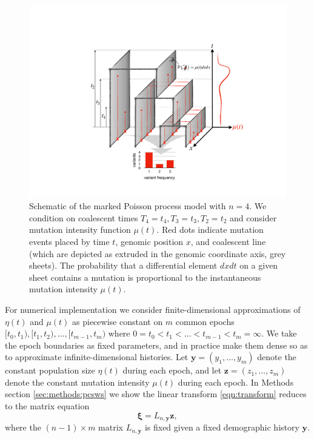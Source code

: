 \documentclass[11pt]{article}
\begin{document}
\begin{figure}
\centering
\includegraphics[width=\textwidth]{figures/model}
\caption{Schematic of the marked Poisson process model with $n=4$.
We condition on coalescent times $T_4=t_4,T_3=t_3,T_2=t_2$ and consider mutation intensity function $\mu(t)$.
Red dots indicate mutation events placed by time $t$, genomic position $x$, and coalescent line (which are depicted as extruded in the genomic coordinate axis, grey sheets).
The probability that a differential element $dxdt$ on a given sheet contains a mutation is proportional to the instantaneous mutation intensity $\mu(t)$.
}
\label{fig:model}
\end{figure}

For numerical implementation we consider finite-dimensional approximations of $\eta(t)$ and $\mu(t)$ as piecewise constant on $m$ common epochs $[t_0, t_1), [t_1, t_2),\dots, [t_{m-1}, t_m)$ where $0=t_0 < t_1 < \dots < t_{m-1} < t_m=\infty$.
We take the epoch boundaries as fixed parameters, and in practice make them dense so as to approximate infinite-dimensional histories.
Let $\boldsymbol y = (y_1,\dots,y_m)$ denote the constant population size $\eta(t)$ during each epoch, and let $\boldsymbol z = (z_1,\dots,z_m)$ denote the constant mutation intensity $\mu(t)$ during each epoch.
In Methods section \ref{sec:methods:pcsws} we show the linear transform \eqref{eqn:transform} reduces to the matrix equation
\begin{equation}
\label{eqn:transform_discrete}
\boldsymbol \xi = L_{n, \boldsymbol y} \boldsymbol z,
\end{equation}
where the $(n-1)\times m$ matrix $L_{n, \boldsymbol y}$ is fixed given a fixed demographic history $\boldsymbol y$.
\end{document}
